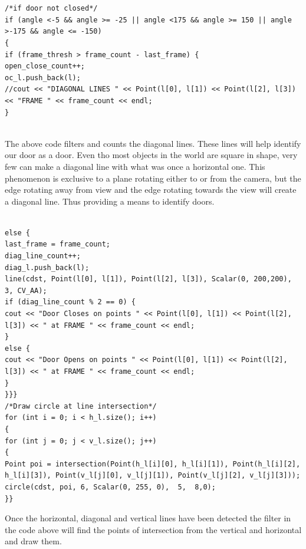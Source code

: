 \documentclass{article}
\begin{document}
\begin{lstlisting}


/*if door not closed*/
if (angle <-5 && angle >= -25 || angle <175 && angle >= 150 || angle >-175 && angle <= -150)
{
if (frame_thresh > frame_count - last_frame) {
open_close_count++;
oc_l.push_back(l);
//cout << "DIAGONAL LINES " << Point(l[0], l[1]) << Point(l[2], l[3]) << "FRAME " << frame_count << endl;
}


\end{lstlisting}
The above code filters and counts the diagonal lines. These lines will help identify our door as a door. Even tho most objects in the world are square in shape, very few can make a diagonal line with what was once a horizontal one. This phenomenon is exclusive to a plane rotating either to or from the camera, but the edge rotating away from view and the edge rotating towards the view will create a diagonal line. Thus providing a means to identify doors.\\
\begin{lstlisting}

else {
last_frame = frame_count;
diag_line_count++;
diag_l.push_back(l);
line(cdst, Point(l[0], l[1]), Point(l[2], l[3]), Scalar(0, 200,200), 3, CV_AA);
if (diag_line_count % 2 == 0) {
cout << "Door Closes on points " << Point(l[0], l[1]) << Point(l[2], l[3]) << " at FRAME " << frame_count << endl;
}
else {
cout << "Door Opens on points " << Point(l[0], l[1]) << Point(l[2], l[3]) << " at FRAME " << frame_count << endl;
}
}}}
/*Draw circle at line intersection*/
for (int i = 0; i < h_l.size(); i++)
{
for (int j = 0; j < v_l.size(); j++)
{
Point poi = intersection(Point(h_l[i][0], h_l[i][1]), Point(h_l[i][2], h_l[i][3]), Point(v_l[j][0], v_l[j][1]), Point(v_l[j][2], v_l[j][3]));
circle(cdst, poi, 6, Scalar(0, 255, 0),  5,  8,0);
}}

\end{lstlisting}
Once the horizontal, diagonal and vertical lines have been detected the filter in the code above will find the points of intersection from the vertical and horizontal and draw them.\\
\end{document}
